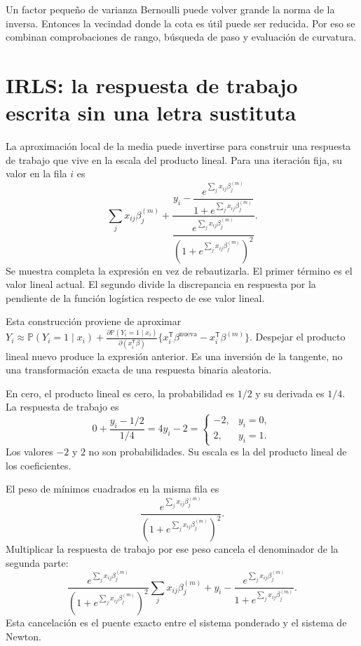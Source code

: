 \documentclass[11pt,a4paper]{article}
\newcommand{\Prob}{\mathbb P}
\newcommand{\T}{^{\mathsf T}}
\begin{document}
Un factor pequeño de varianza Bernoulli puede volver grande la
norma de la inversa. Entonces la vecindad donde la cota es útil
puede ser reducida.
Por eso se combinan comprobaciones de rango, búsqueda de paso
y evaluación de curvatura.

\clearpage
\section{IRLS: la respuesta de trabajo escrita sin una letra sustituta}\label{logit47}
La aproximación local de la media puede invertirse para construir una
respuesta de trabajo que vive en la escala del producto lineal.
Para una iteración fija, su valor en la fila $i$ es
\[
\sum_jx_{ij}\beta_j^{(m)}
+
\frac{
y_i-\dfrac{e^{\sum_jx_{ij}\beta_j^{(m)}}}
{1+e^{\sum_jx_{ij}\beta_j^{(m)}}}}
{\dfrac{e^{\sum_jx_{ij}\beta_j^{(m)}}}
{(1+e^{\sum_jx_{ij}\beta_j^{(m)}})^2}}.
\]
Se muestra completa la expresión en vez de rebautizarla.
El primer término es el valor lineal actual.
El segundo divide la discrepancia en respuesta por la pendiente
de la función logística respecto de ese valor lineal.

Esta construcción proviene de aproximar
$Y_i\approx\Prob(Y_i=1\mid x_i)+
\frac{\partial\Prob(Y_i=1\mid x_i)}{\partial(x_i\T\beta)}
\{x_i\T\beta^{\mathrm{nueva}}-x_i\T\beta^{(m)}\}$.
Despejar el producto lineal nuevo produce la expresión anterior.
Es una inversión de la tangente, no una transformación exacta
de una respuesta binaria aleatoria.

\begin{ejemplo}
En cero, el producto lineal es cero, la probabilidad es $1/2$ y
su derivada es $1/4$.
La respuesta de trabajo es
\[
0+\frac{y_i-1/2}{1/4}=4y_i-2=
\begin{cases}-2,&y_i=0,\\2,&y_i=1.\end{cases}
\]
Los valores $-2$ y $2$ no son probabilidades.
Su escala es la del producto lineal de los coeficientes.
\end{ejemplo}
El peso de mínimos cuadrados en la misma fila es
\[
\frac{e^{\sum_jx_{ij}\beta_j^{(m)}}}
{(1+e^{\sum_jx_{ij}\beta_j^{(m)}})^2}.
\]
Multiplicar la respuesta de trabajo por ese peso cancela el
denominador de la segunda parte:
\[
\frac{e^{\sum_jx_{ij}\beta_j^{(m)}}}
{(1+e^{\sum_jx_{ij}\beta_j^{(m)}})^2}
\sum_jx_{ij}\beta_j^{(m)}
+y_i-\frac{e^{\sum_jx_{ij}\beta_j^{(m)}}}
{1+e^{\sum_jx_{ij}\beta_j^{(m)}}}.
\]
Esta cancelación es el puente exacto entre el sistema ponderado
y el sistema de Newton.
\end{document}
